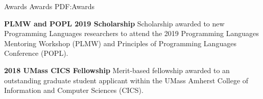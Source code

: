 \Section
{Awards}
{Awards}
{PDF:Awards}

\Entry
\textbf{PLMW and POPL 2019 Scholarship}
\dotfill
\textbf{}
\SubEntry
\Gap
Scholarship awarded to new Programming Languages researchers to attend the 2019 Programming Languages Mentoring Workshop (PLMW) and Principles of Programming Languages Conference (POPL).

\BigGap
\Entry
\textbf{2018 UMass CICS Fellowship}
\dotfill
\textbf{}
\SubEntry
\Gap
Merit-based fellowship awarded to an outstanding graduate student applicant within the UMass Amherst College of Information and Computer Sciences (CICS).
